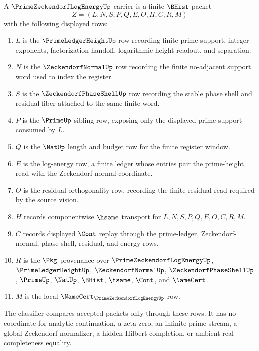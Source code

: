 \begin{definition}
\label{def:prime-zeckendorf-log-energy-carrier}
A $\PrimeZeckendorfLogEnergyUp$ carrier is a finite $\BHist$ packet
$$
Z=(L,N,S,P,Q,E,O,H,C,R,M)
$$
with the following displayed rows:
\begin{enumerate}
\item $L$ is the $\PrimeLedgerHeightUp$ row recording finite prime support, integer exponents, factorization handoff, logarithmic-height readout, and separation.
\item $N$ is the $\ZeckendorfNormalUp$ row recording the finite no-adjacent support word used to index the register.
\item $S$ is the $\ZeckendorfPhaseShellUp$ row recording the stable phase shell and residual fiber attached to the same finite word.
\item $P$ is the $\PrimeUp$ sibling row, exposing only the displayed prime support consumed by $L$.
\item $Q$ is the $\NatUp$ length and budget row for the finite register window.
\item $E$ is the log-energy row, a finite ledger whose entries pair the prime-height read with the Zeckendorf-normal coordinate.
\item $O$ is the residual-orthogonality row, recording the finite residual read required by the source vision.
\item $H$ records componentwise $\hsame$ transport for $L,N,S,P,Q,E,O,C,R,M$.
\item $C$ records displayed $\Cont$ replay through the prime-ledger, Zeckendorf-normal, phase-shell, residual, and energy rows.
\item $R$ is the $\Pkg$ provenance over $\PrimeZeckendorfLogEnergyUp$, $\PrimeLedgerHeightUp$, $\ZeckendorfNormalUp$, $\ZeckendorfPhaseShellUp$, $\PrimeUp$, $\NatUp$, $\BHist$, $\hsame$, $\Cont$, and $\NameCert$.
\item $M$ is the local $\NameCert_{\PrimeZeckendorfLogEnergyUp}$ row.
\end{enumerate}
The classifier compares accepted packets only through these rows. It has no coordinate for analytic continuation, a zeta zero, an infinite prime stream, a global Zeckendorf normalizer, a hidden Hilbert completion, or ambient real-completeness equality.
\end{definition}

